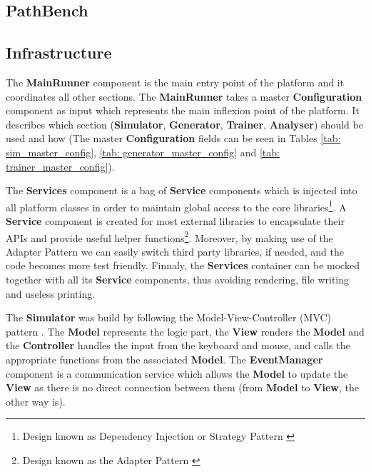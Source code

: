 
\begin{appendices}
\chapter{PathBench} \label{sec: app_env}

\section{Infrastructure} \label{sec: infra}
The \textbf{MainRunner} component is the main entry point of the platform and it coordinates all other sections. The \textbf{MainRunner} takes a master \textbf{Configuration} component as input which represents the main inflexion point of the platform. It describes which section (\textbf{Simulator}, \textbf{Generator}, \textbf{Trainer}, \textbf{Analyser}) should be used and how (The master \textbf{Configuration} fields can be seen in Tables \ref{tab: sim_master_config}, \ref{tab: generator_master_config} and \ref{tab: trainer_master_config}).

The \textbf{Services} component is a bag of \textbf{Service} components which is injected into all platform classes in order to maintain global access to the core libraries\footnote{Design known as Dependency Injection or Strategy Pattern \cite{hannemann2002design}}. A \textbf{Service} component is created for most external libraries to encapsulate their APIs and provide useful helper functions\footnote{Design known as the Adapter Pattern \cite{hannemann2002design}}. Moreover, by making use of the Adapter Pattern we can easily switch third party libraries, if needed, and the code becomes more test friendly. Finnaly, the \textbf{Services} container can be mocked together with all its \textbf{Service} components, thus avoiding rendering, file writing and useless printing.

The \textbf{Simulator} was build by following the Model-View-Controller (MVC) pattern \cite{krasner1988description}. The \textbf{Model} represents the logic part, the \textbf{View} renders the \textbf{Model} and the \textbf{Controller} handles the input from the keyboard and mouse, and calls the appropriate functions from the associated \textbf{Model}. The \textbf{EventManager} component is a communication service which allows the \textbf{Model} to update the \textbf{View} as there is no direct connection between them (from \textbf{Model} to \textbf{View}, the other way is).


\end{appendices}
